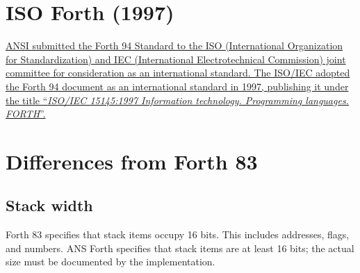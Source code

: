 
\cbstart{}
\section[ISO Forth (1997)]{ISO Forth (1997)}
\label{diff:iso}

\uline{%
ANSI submitted the Forth 94 Standard to the
ISO (International Organization for Standardization) and
IEC (International Electrotechnical Commission) joint committee for
consideration as an international standard.
The ISO/IEC adopted the Forth 94 document as an international standard
in 1997, publishing it under the title ``\emph{ISO/IEC 15145:1997
Information technology.  Programming languages.  FORTH}''.
}
\cbend

\section{Differences from Forth 83} %


\subsection{Stack width} %

Forth 83 specifies that stack items occupy 16 bits. This includes
addresses, flags, and numbers. ANS Forth specifies that stack items
are at least 16 bits; the actual size must be documented by the
implementation.

